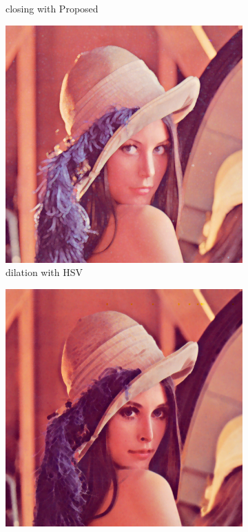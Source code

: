 \begin{figure}[!ht]
\begin{subfigure}[t]{0.22\textwidth}
    \caption{closing with Proposed}
    \centering
  \end{subfigure}
\begin{subfigure}[t]{0.22\textwidth}
    \includegraphics[width=0.9\linewidth]{../project/images/outputs/compare_order/dilation_HSV.png}
    \caption{dilation with HSV}
    \centering
  \end{subfigure}
\begin{subfigure}[t]{0.22\textwidth}
    \includegraphics[width=0.9\linewidth]{../project/images/outputs/compare_order/erosion_HSV.png}

\end{subfigure}
\end{figure}
